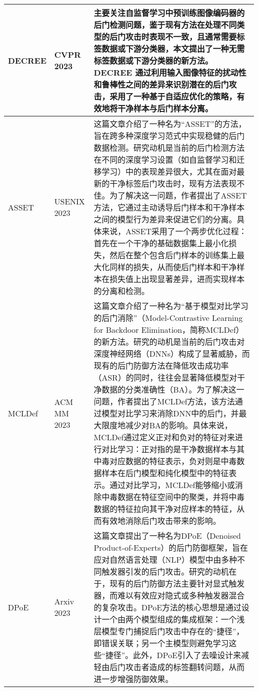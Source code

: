 \documentclass[lettersize,journal]{IEEEtran}
\begin{document}
\begin{longtable}{|p{3.5cm}|p{2cm}|p{10.5cm}|}
    DECREE\cite{feng2023detecting} & CVPR 2023 & 主要关注自监督学习中预训练图像编码器的后门检测问题，鉴于现有方法在处理不同类型的后门攻击时表现不一致，且通常需要标签数据或下游分类器，本文提出了一种无需标签数据或下游分类器的新方法。DECREE 通过利用输入图像特征的扰动性和鲁棒性之间的差异来识别潜在的后门攻击，采用了一种基于自适应优化的策略，有效地将干净样本与后门样本分离。 \\ \hline

    ASSET\cite{pan2023asset} & USENIX 2023 & 这篇文章介绍了一种名为“ASSET”的方法，旨在跨多种深度学习范式中实现稳健的后门数据检测。研究动机是当前的后门检测方法在不同的深度学习设置（如自监督学习和迁移学习）中的表现差异很大，尤其在面对最新的干净标签后门攻击时，现有方法表现不佳。为了解决这一问题，作者提出了ASSET方法，它通过主动诱导后门样本和干净样本之间的模型行为差异来促进它们的分离。具体来说，ASSET采用了一个两步优化过程：首先在一个干净的基础数据集上最小化损失，然后在整个包含后门样本的训练集上最大化同样的损失，从而使后门样本和干净样本在损失值上出现显著差异，进而实现样本的分离和检测。\\ \hline

    MCLDef\cite{yue2023model} & ACM MM 2023 & 这篇文章介绍了一种名为“基于模型对比学习的后门消除”（Model-Contrastive Learning for Backdoor Elimination，简称MCLDef）的新方法。研究的动机是当前的后门攻击对深度神经网络（DNNs）构成了显著威胁，而现有的后门防御方法在降低攻击成功率（ASR）的同时，往往会显著降低模型对干净数据的分类准确性（BA）。为了解决这一问题，作者提出了MCLDef方法，该方法通过模型对比学习来消除DNN中的后门，并最大限度地减少对BA的影响。具体来说，MCLDef通过定义正对和负对的特征对来进行对比学习：正对指的是干净数据样本与其中毒对应数据的特征表示，负对则是中毒数据样本在后门模型和纯化模型中的特征表示。通过对比学习，MCLDef能够缩小或消除中毒数据在特征空间中的聚类，并将中毒数据的特征拉向其干净对应样本的特征，从而有效地消除后门攻击带来的影响。 \\ \hline

    DPoE\cite{liu2023shortcuts} & Arxiv 2023 & 这篇文章提出了一种名为DPoE（Denoised Product-of-Experts）的后门防御框架，旨在应对自然语言处理（NLP）模型中由多种不同触发器引发的后门攻击。研究的动机在于，现有的后门防御方法主要针对显式触发器，而难以有效应对隐式或多种触发器混合的复杂攻击。DPoE方法的核心思想是通过设计一个由两个模型组成的集成框架：一个浅层模型专门捕捉后门攻击中存在的“捷径”，即错误关联；另一个主模型则避免学习这些“捷径”。此外，DPoE引入了去噪设计来减轻由后门攻击者造成的标签翻转问题，从而进一步增强防御效果。 \\ \hline


\end{longtable}
\end{document}
